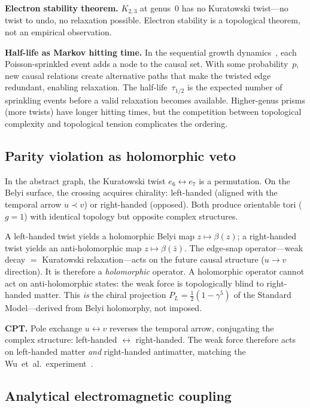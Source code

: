 \documentclass[aps,prd,twocolumn,superscriptaddress,nofootinbib,amsmath,amssymb,longbibliography]{revtex4-2}
\begin{document}
\textbf{Electron stability theorem.}
$K_{2,3}$ at genus~0 has no Kuratowski twist---no twist to undo, no
relaxation possible.  Electron stability is a topological theorem, not
an empirical observation.

\textbf{Half-life as Markov hitting time.}
In the sequential growth dynamics~\cite{rideout2000}, each
Poisson-sprinkled event adds a node to the causal set.
With some probability~$p$, new causal relations create alternative
paths that make the twisted edge redundant, enabling relaxation.
The half-life~$\tau_{1/2}$ is the expected number of sprinkling events
before a valid relaxation becomes available.
Higher-genus prisms (more twists) have longer hitting times, but the
competition between topological complexity and topological tension
complicates the ordering.

\subsection{Parity violation as holomorphic veto}\label{sec:parity}

In the abstract graph, the Kuratowski twist
$e_6 \leftrightarrow e_7$ is a permutation.
On the Belyi surface, the crossing acquires chirality: left-handed
(aligned with the temporal arrow $u \prec v$) or right-handed
(opposed).
Both produce orientable tori ($g = 1$) with identical topology but
opposite complex structures.

A left-handed twist yields a holomorphic Belyi map
$z \mapsto \beta(z)$; a right-handed twist yields an anti-holomorphic
map $z \mapsto \beta(\bar{z})$.
The edge-snap operator---weak decay $=$ Kuratowski
relaxation---acts on the future causal structure ($u \to v$
direction).  It is therefore a \emph{holomorphic} operator.
A holomorphic operator cannot act on anti-holomorphic states:
the weak force is topologically blind to right-handed matter.
This \emph{is} the chiral projection
$P_L = \tfrac{1}{2}(1 - \gamma^5)$ of the Standard Model---derived
from Belyi holomorphy, not imposed.

\textbf{CPT.}
Pole exchange $u \leftrightarrow v$ reverses the temporal arrow,
conjugating the complex structure: left-handed $\leftrightarrow$
right-handed.
The weak force therefore acts on left-handed matter \emph{and}
right-handed antimatter, matching the Wu~et~al.\
experiment~\cite{wu1957}.

\subsection{Analytical electromagnetic coupling}\label{sec:alpha_analytical}
\end{document}
